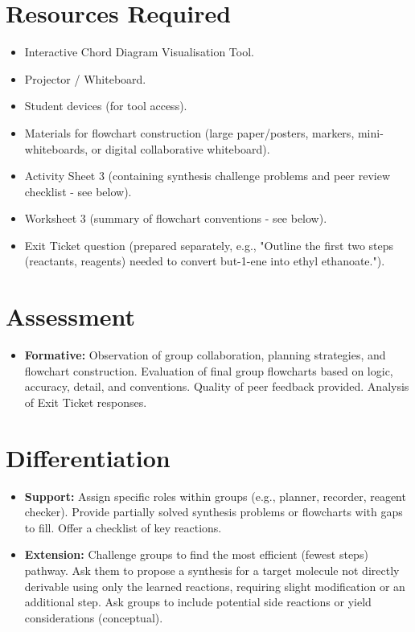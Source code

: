 \documentclass[11pt, a4paper]{article}
\begin{document}
\section*{Resources Required}
\begin{itemize}
    \item Interactive Chord Diagram Visualisation Tool.
    \item Projector / Whiteboard.
    \item Student devices (for tool access).
    \item Materials for flowchart construction (large paper/posters, markers, mini-whiteboards, or digital collaborative whiteboard).
    \item Activity Sheet 3 (containing synthesis challenge problems and peer review checklist - see below).
    \item Worksheet 3 (summary of flowchart conventions - see below).
    \item Exit Ticket question (prepared separately, e.g., "Outline the first two steps (reactants, reagents) needed to convert but-1-ene into ethyl ethanoate.").
\end{itemize}

\section*{Assessment}
\begin{itemize}
    \item \textbf{Formative:} Observation of group collaboration, planning strategies, and flowchart construction. Evaluation of final group flowcharts based on logic, accuracy, detail, and conventions. Quality of peer feedback provided. Analysis of Exit Ticket responses.
\end{itemize}

\section*{Differentiation}
\begin{itemize}
    \item \textbf{Support:} Assign specific roles within groups (e.g., planner, recorder, reagent checker). Provide partially solved synthesis problems or flowcharts with gaps to fill. Offer a checklist of key reactions.
    \item \textbf{Extension:} Challenge groups to find the most efficient (fewest steps) pathway. Ask them to propose a synthesis for a target molecule not directly derivable using only the learned reactions, requiring slight modification or an additional step. Ask groups to include potential side reactions or yield considerations (conceptual).
\end{itemize}
\end{document}
